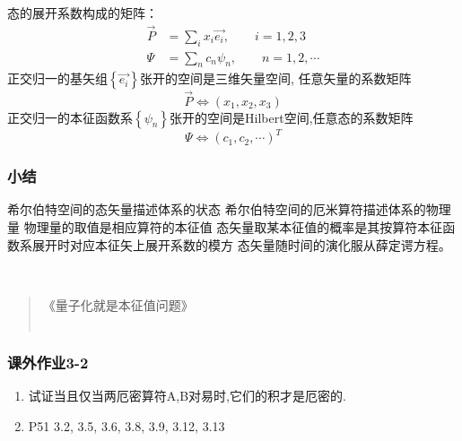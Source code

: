 \begin{frame} 
    态的展开系数构成的矩阵：\\ \vspace{0.3em}
    \begin{equation*}
        \begin{split}
            \vec{P}&=\sum_i{x_i\vec{e_i}}, \qquad i=1,2,3 \\
            \Psi&=\sum_n c_n \psi_n, \qquad n=1,2,\cdots 
        \end{split}  
    \end{equation*}
    正交归一的基矢组{$\left\{\vec{e_i}\right\}$}张开的空间是三维矢量空间, 任意矢量的系数矩阵 
    \[\vec{P}\Leftrightarrow(x_1,x_2,x_3)\]
    正交归一的本征函数系{$\left\{\psi_n\right\}$}张开的空间是Hilbert空间,任意态的系数矩阵 
    \[\Psi\Leftrightarrow(c_1,c_2,\cdots)^T\]
\end{frame} 

\begin{frame}
    \frametitle{小结}
   \begin{itemize}
       \Item 希尔伯特空间的态矢量描述体系的状态
       \Item 希尔伯特空间的厄米算符描述体系的物理量
       \Item 物理量的取值是相应算符的本征值
       \Item 态矢量取某本征值的概率是其按算符本征函数系展开时对应本征矢上展开系数的模方
       \Item 态矢量随时间的演化服从薛定谔方程。
   \end{itemize}
   ~~ \\ \vspace{1.0em}
   \begin{quote}
    《量子化就是本征值问题》\\
    ~~\\
 \end{quote}
\end{frame} 

\begin{frame}
    \frametitle{课外作业3-2}
    \begin{enumerate}
        \item 试证当且仅当两厄密算符A,B对易时,它们的积才是厄密的.
        \item P51 3.2, 3.5, 3.6, 3.8, 3.9, 3.12, 3.13 
    \end{enumerate}
\end{frame}





